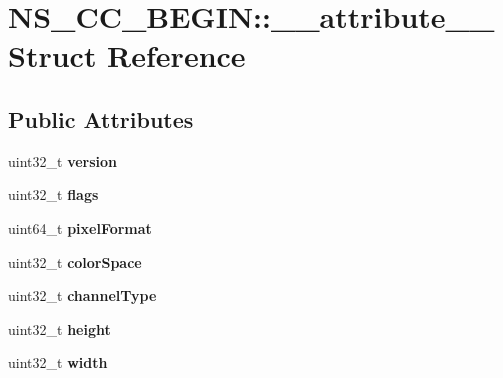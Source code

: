 \hypertarget{structNS__CC__BEGIN_1_1____attribute____}{}\section{N\+S\+\_\+\+C\+C\+\_\+\+B\+E\+G\+IN\+:\+:\+\_\+\+\_\+attribute\+\_\+\+\_\+ Struct Reference}
\label{structNS__CC__BEGIN_1_1____attribute____}
\subsection*{Public Attributes}
\begin{DoxyCompactItemize}
\item 
\mbox{\label{structNS__CC__BEGIN_1_1____attribute_____a31d2a2fad37f62ce3919384a9a9845bb}} 
uint32\+\_\+t {\bfseries version}
\item 
\mbox{\label{structNS__CC__BEGIN_1_1____attribute_____a0e55029d7a88d0463836e1827d4027f4}} 
uint32\+\_\+t {\bfseries flags}
\item 
\mbox{\label{structNS__CC__BEGIN_1_1____attribute_____a82fcb5ce3172b2acbbe90be79eb630ed}} 
uint64\+\_\+t {\bfseries pixel\+Format}
\item 
\mbox{\label{structNS__CC__BEGIN_1_1____attribute_____a0c3fcb1f2e44b8c3beffba8048d147a5}} 
uint32\+\_\+t {\bfseries color\+Space}
\item 
\mbox{\label{structNS__CC__BEGIN_1_1____attribute_____ab400196d5e02b6a1360900bb953133a1}} 
uint32\+\_\+t {\bfseries channel\+Type}
\item 
\mbox{\label{structNS__CC__BEGIN_1_1____attribute_____ad1b566fea02ecf0cc38ff566ec5632e6}} 
uint32\+\_\+t {\bfseries height}
\item 
\mbox{\label{structNS__CC__BEGIN_1_1____attribute_____abb412891565d96f80d0306c413454536}} 
uint32\+\_\+t {\bfseries width}

\end{DoxyCompactItemize}
